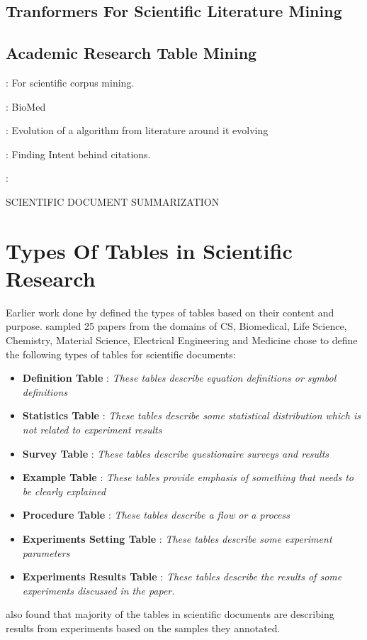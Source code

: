 \subsection{Tranformers For Scientific Literature Mining}


\subsection{Academic Research Table Mining}

\cite{beltagy2019scibert} : For scientific corpus mining. 

\cite{milosevic2019framework} : BioMed 

\cite{zha2019mining} : Evolution of a algorithm from literature around it evolving

\cite{cohan2019structural} : Finding Intent behind citations. 

\cite{agarwal2008literature} : 

SCIENTIFIC DOCUMENT SUMMARIZATION

\section{Types Of Tables in Scientific Research}
\label{relatedwork:table-type}
Earlier work done by \cite{kim2012scientific} defined the types of tables based on their content and purpose. \cite{kim2012scientific} sampled 25 papers from the domains of CS, Biomedical, Life Science, Chemistry, Material Science, Electrical Engineering and Medicine chose to define the following types of tables for scientific documents:
\begin{itemize}
    \item \textbf{Definition Table} : \textit{These tables describe equation definitions or symbol definitions}
    \item \textbf{Statistics Table} : \textit{These tables describe some statistical distribution which is not related to experiment results}
    \item \textbf{Survey Table } : \textit{These tables describe questionaire surveys and results }
    \item \textbf{Example Table } : \textit{These tables provide emphasis of something that needs to be clearly explained }
    \item \textbf{Procedure Table} : \textit{These tables describe a flow or a process}
    \item \textbf{Experiments Setting Table } : \textit{These tables describe some experiment parameters}
    \item \textbf{Experiments Results Table } : \textit{These tables describe the results of some experiments discussed in the paper.}
\end{itemize}

\cite{kim2012scientific} also found that majority of the tables in scientific documents are describing results from experiments based on the samples they annotated. 


